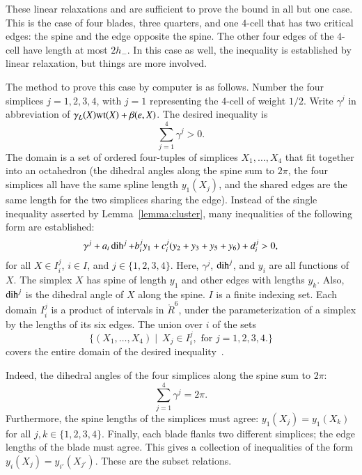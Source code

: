 These linear relaxations and are sufficient to prove the bound in all but one case.  This is the case of four blades, three quarters, and one $4$-cell that has two critical edges: the spine and the edge opposite the spine.  The other four edges of the $4$-cell have length at most $2h_-$.  In this case as well, the inequality is established by linear relaxation, but things are more involved.  

The method to prove this case by computer is as follows.  Number the four simplices $j=1,2,3,4$, with $j=1$ representing the $4$-cell of weight $1/2$.  Write $\gamma^j$ in abbreviation of $\gamma_L(X){\operatorname{wt}}(X) + \beta(e,X)$.   The desired inequality is
\begin{equation}\label{eqn:gpos}
\sum_{j=1}^4 \gamma^j > 0.
\end{equation}
The domain is a set of ordered four-tuples of simplices $X_1,\ldots,X_4$ that fit together into an octahedron (the dihedral angles along the spine sum to $2\pi$, the four simplices all have the same spline length $y_1(X_j)$, and the shared edges are the same length for the two simplices sharing the edge).
Instead of the single inequality asserted by Lemma~\ref{lemma:cluster},  many inequalities of the following form are established:
\begin{equation}\label{eqn:gpart}
\gamma^j + a_i \operatorname{dih}^j + b_i^j y_1 + c_i^j (y_2+y_3+y_5+y_6) + d_i^j > 0, 
\end{equation}
for all $X \in I_i^j$, \quad $i \in I$, and  $j\in \{1,2,3,4\}$.  Here, $\gamma^j$, $\operatorname{dih}^j$, and $y_i$ are
all functions of $X$.
The simplex $X$ has spine of length $y_1$ and other edges with lengths $y_k$.  Also,  $\operatorname{dih}^j$ is the dihedral angle of $X$ along the spine.
$I$ is a finite indexing set.  Each domain $I_i^j$ is a product of intervals in $\ring{R}^6$, under the parameterization of a simplex by the lengths of its six edges.  The union over $i$ of the sets
\begin{displaymath}
\{(X_1,\ldots,X_4)\mid~ X_j \in I_i^j,\text{ for } j=1,2,3,4.\}
\end{displaymath}
covers the entire domain of the desired inequality~.   

  Indeed, the dihedral angles of the four simplices along the spine sum to $2\pi$:
\begin{displaymath}
\sum_{j=1}^4 \gamma^j = 2\pi.
\end{displaymath}
Furthermore, the spine lengths of the simplices must agree: $y_1(X_j) = y_1(X_k)$ for all $j,k\in\{1,2,3,4\}$.
Finally, each blade flanks two different simplices; the edge lengths of the blade must agree.  This gives
a collection of inequalities of the form $y_i(X_j) = y_{i'}(X_{j'})$.  These are the subset relations.

